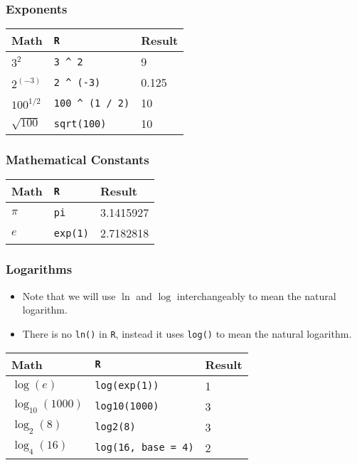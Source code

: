 \documentclass[]{book}
\providecommand{\tightlist}{%
  \setlength{\itemsep}{0pt}\setlength{\parskip}{0pt}}
\begin{document}
\subsubsection*{Exponents}\label{exponents}

\begin{longtable}[]{@{}lll@{}}
\toprule
Math & \texttt{R} & Result\tabularnewline
\midrule
\endhead
\(3^2\) & \texttt{3\ \^{}\ 2} & 9\tabularnewline
\(2^{(-3)}\) & \texttt{2\ \^{}\ (-3)} & 0.125\tabularnewline
\(100^{1/2}\) & \texttt{100\ \^{}\ (1\ /\ 2)} & 10\tabularnewline
\(\sqrt{100}\) & \texttt{sqrt(100)} & 10\tabularnewline
\bottomrule
\end{longtable}

\subsubsection*{Mathematical Constants}\label{mathematical-constants}

\begin{longtable}[]{@{}lll@{}}
\toprule
Math & \texttt{R} & Result\tabularnewline
\midrule
\endhead
\(\pi\) & \texttt{pi} & 3.1415927\tabularnewline
\(e\) & \texttt{exp(1)} & 2.7182818\tabularnewline
\bottomrule
\end{longtable}

\subsubsection*{Logarithms}\label{logarithms}

\begin{itemize}
\tightlist
\item
  Note that we will use \(\ln\) and \(\log\) interchangeably to mean the
  natural logarithm.
\item
  There is no \texttt{ln()} in \texttt{R}, instead it uses
  \texttt{log()} to mean the natural logarithm.
\end{itemize}

\begin{longtable}[]{@{}lll@{}}
\toprule
Math & \texttt{R} & Result\tabularnewline
\midrule
\endhead
\(\log(e)\) & \texttt{log(exp(1))} & 1\tabularnewline
\(\log_{10}(1000)\) & \texttt{log10(1000)} & 3\tabularnewline
\(\log_{2}(8)\) & \texttt{log2(8)} & 3\tabularnewline
\(\log_{4}(16)\) & \texttt{log(16,\ base\ =\ 4)} & 2\tabularnewline
\bottomrule
\end{longtable}
\end{document}
